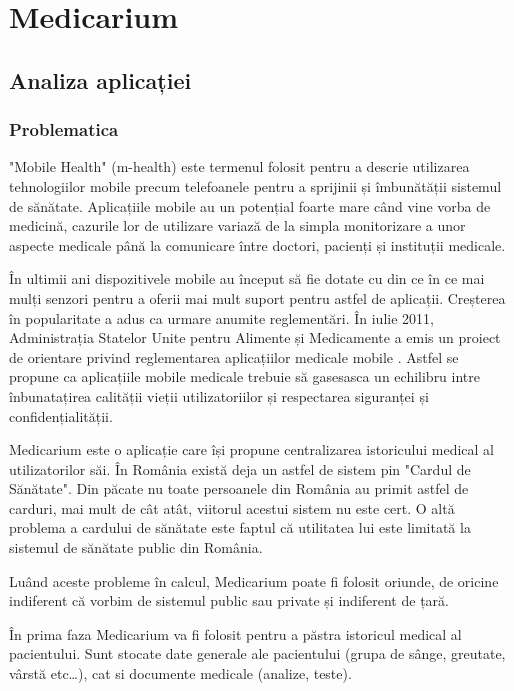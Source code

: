 \documentclass[12pt]{article}
\begin{document}
\newpage
\section{Medicarium}
\subsection{Analiza aplicației}
\subsubsection{Problematica}


"Mobile Health" (m-health) \cite{kahn2010mobile}
este termenul folosit pentru a descrie utilizarea tehnologiilor mobile precum telefoanele pentru
a sprijinii și îmbunătății sistemul de sănătate. Aplicațiile mobile au un potențial foarte mare când vine vorba de medicină, cazurile lor
de utilizare variază de la simpla monitorizare a unor aspecte medicale până la 
comunicare între doctori, pacienți și instituții medicale.

În ultimii ani dispozitivele mobile au început să fie dotate cu din ce în ce mai mulți
senzori pentru a oferii mai mult suport pentru astfel de aplicații. Creșterea în popularitate a adus ca urmare anumite reglementări.
În iulie 2011, Administrația Statelor Unite pentru Alimente și Medicamente a emis un proiect de orientare privind 
reglementarea aplicațiilor medicale mobile \cite{barton2012regulation}. Astfel se propune ca aplicațiile
mobile medicale trebuie să gasesasca un echilibru intre înbunatațirea calității vieții utilizatoriilor și 
respectarea siguranței și confidențialității.


Medicarium este o aplicație care își propune centralizarea istoricului medical al utilizatorilor săi.
În România există deja un astfel de sistem pin "Cardul de Sănătate". Din păcate nu toate persoanele din România 
au primit astfel de carduri, mai mult de cât atât, viitorul acestui sistem nu este cert. O altă problema a cardului
de sănătate este faptul că utilitatea lui este limitată la sistemul de sănătate public
din România.

Luând aceste probleme în calcul, Medicarium poate fi folosit oriunde, de oricine indiferent
că vorbim de sistemul public sau private și indiferent de țară.

În prima faza Medicarium va fi folosit pentru a păstra istoricul medical al pacientului. 
Sunt stocate date generale ale pacientului (grupa de sânge, greutate, vârstă etc\dots), 
cat si documente medicale (analize, teste).
\end{document}
